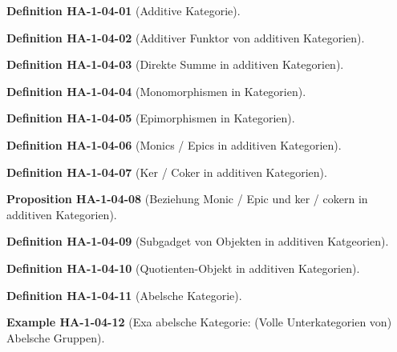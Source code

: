 \documentclass[10pt, letterpaper]{article}
\newcommand{\CustomHeading}[3]{%
  \par\medskip\noindent%
  \textbf{#1 #2} \textnormal{(#3)}.\enskip%
}
\newenvironment{DEF}[2]{\CustomHeading{Definition}{#1}{#2}}{}
\newenvironment{PROP}[2]{\CustomHeading{Proposition}{#1}{#2}}{}
\newenvironment{EXA}[2]{\CustomHeading{Example}{#1}{#2}}{}
\begin{document}
\begin{DEF}{HA-1-04-01}{Additive Kategorie}
\end{DEF}

\begin{DEF}{HA-1-04-02}{Additiver Funktor von additiven Kategorien}
\end{DEF}

\begin{DEF}{HA-1-04-03}{Direkte Summe in additiven Kategorien}
\end{DEF}

\begin{DEF}{HA-1-04-04}{Monomorphismen in Kategorien}
\end{DEF}

\begin{DEF}{HA-1-04-05}{Epimorphismen in Kategorien}
\end{DEF}

\begin{DEF}{HA-1-04-06}{Monics / Epics in additiven Kategorien}
\end{DEF}

\begin{DEF}{HA-1-04-07}{Ker / Coker in additiven Kategorien}
\end{DEF}

\begin{PROP}{HA-1-04-08}{Beziehung Monic / Epic und ker / cokern in additiven Kategorien}
\end{PROP}

\begin{DEF}{HA-1-04-09}{Subgadget von Objekten in additiven Katgeorien}
\end{DEF}

\begin{DEF}{HA-1-04-10}{Quotienten-Objekt in additiven Kategorien}
\end{DEF}

\begin{DEF}{HA-1-04-11}{Abelsche Kategorie}
\end{DEF}

\begin{EXA}{HA-1-04-12}{Exa abelsche Kategorie: (Volle Unterkategorien von) Abelsche Gruppen}
\end{EXA}
\end{document}
